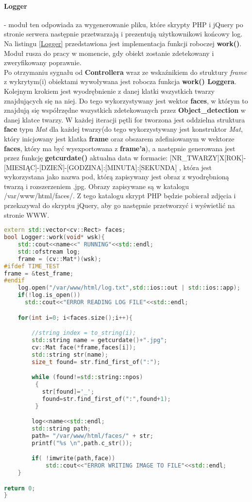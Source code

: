 \paragraph{Logger} - moduł ten odpowiada za wygenerowanie pliku, które skrypty PHP i jQuery po stronie serwera następnie przetwarzają i prezentują użytkownikowi końcowy log. Na listingu \ref{Logger} przedstawiona jest implementacja funkcji roboczej \textbf{work()}.
Moduł rusza do pracy w momencie, gdy obiekt zostanie zdetekowany i zweryfikowany poprawnie.\\
Po otrzymaniu sygnału od \textbf{Controllera} wraz ze wskaźnikiem do struktury \textit{frame} z wykrytym(i) obiektami wywoływana jest robocza funkcja \textbf{work() Loggera}.\\
Kolejnym krokiem jest wyodrębnienie z danej klatki wszystkich twarzy znajdujących się na niej. Do tego wykorzystywany jest wektor \textbf{faces}, w którym to znajdują się współrzędne wszystkich zdetekowanych przez \textbf{Object\_detection} w danej klatce twarzy. W każdej iteracji pętli for tworzona jest oddzielna struktura \textbf{face} typu \textit{Mat} dla każdej twarzy(do tego wykorzystywany jest konstruktor \textit{Mat}, który inicjowany jest klatka \textbf{frame} oraz obszarem zdefiniowanym w wektorze \textbf{faces}, który ma być wyexportowana z \textbf{frame'a}), a następnie generowana jest przez funkcję \textbf{getcurdate()} aktualna data w formacie: [NR\_TWARZY]X[ROK]-[MIESIĄC]-[DZIEŃ]-[GODZINA]:[MINUTA]:[SEKUNDA] , która jest wykorzystana jako nazwa pod, którą zapisywany jest obraz z wyodrębnioną twarzą i rozszerzeniem .jpg. Obrazy zapisywane są w katalogu /var/www/html/faces/. Z tego katalogu skrypt PHP będzie pobierał zdjęcia i przekazywał do skryptu jQuery, aby go następnie przetworzyć i wyświetlić na stronie WWW.
\begin{lstlisting}[caption = {Funkcja robocza klasy Logger.}, label=Logger, language=C++]
extern std::vector<cv::Rect> faces;
bool Logger::work(void* wsk){
	std::cout<<name<<" RUNNING"<<std::endl; 
	std::ofstream log;
	frame = (cv::Mat*)(wsk);
#ifdef TIME_TEST
frame = &test_frame;
#endif
	log.open("/var/www/html/log.txt",std::ios::out | std::ios::app);
	if(!log.is_open())
	  std::cout<<"ERROR READING LOG FILE"<<std::endl;

	for(int i=0; i<faces.size();i++){

		//string index = to_string(i);
	    std::string name = getcurdate()+".jpg";
	    cv::Mat face(*frame,faces[i]);
	    std::string str(name);
	    size_t found= str.find_first_of(":");

	    while (found!=std::string::npos)
	     {
	       str[found]='_';
	       found=str.find_first_of(":",found+1);
	     }

	    log<<name<<std::endl;
	    std::string path;
	    path= "/var/www/html/faces/" + str;
	    printf("%s \n",path.c_str());

	    if( !imwrite(path,face))
	    	std::cout<<"ERROR WRITING IMAGE TO FILE"<<std::endl;
	}

return 0;
}
\end{lstlisting}

